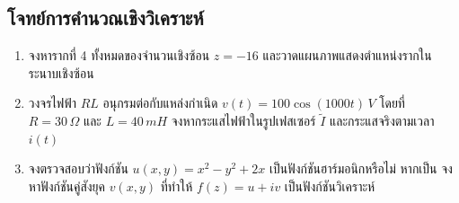 \subsection{โจทย์การคำนวณเชิงวิเคราะห์}
\begin{enumerate}
    \item จงหารากที่ 4 ทั้งหมดของจำนวนเชิงซ้อน $z = -16$ และวาดแผนภาพแสดงตำแหน่งรากในระนาบเชิงซ้อน
    \item วงจรไฟฟ้า $RL$ อนุกรมต่อกับแหล่งกำเนิด $v(t) = 100\cos(1000 t)\,\si{V}$ โดยที่ $R = 30\,\Omega$ และ $L = 40\,\si{mH}$ จงหากระแสไฟฟ้าในรูปเฟสเซอร์ $\tilde{I}$ และกระแสจริงตามเวลา $i(t)$
    \item จงตรวจสอบว่าฟังก์ชัน $u(x, y) = x^2 - y^2 + 2x$ เป็นฟังก์ชันฮาร์มอนิกหรือไม่ หากเป็น จงหาฟังก์ชันคู่สังยุค $v(x, y)$ ที่ทำให้ $f(z) = u + iv$ เป็นฟังก์ชันวิเคราะห์
\end{enumerate}
